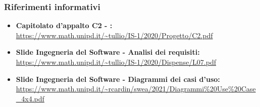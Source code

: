 \subsubsection{Riferimenti informativi}
\begin{itemize}
	\item \textbf{Capitolato d'appalto C2 - \NomeProgetto{}:} \\ \url{https://www.math.unipd.it/~tullio/IS-1/2020/Progetto/C2.pdf}
	\item \textbf{Slide Ingegneria del Software - Analisi dei requisiti:}\\ \url{https://www.math.unipd.it/~tullio/IS-1/2020/Dispense/L07.pdf}
	\item \textbf{Slide Ingegneria del Software - Diagrammi dei casi d'uso:}\\ \url{https://www.math.unipd.it/~rcardin/swea/2021/Diagrammi\%20Use\%20Case_4x4.pdf}
\end{itemize}
